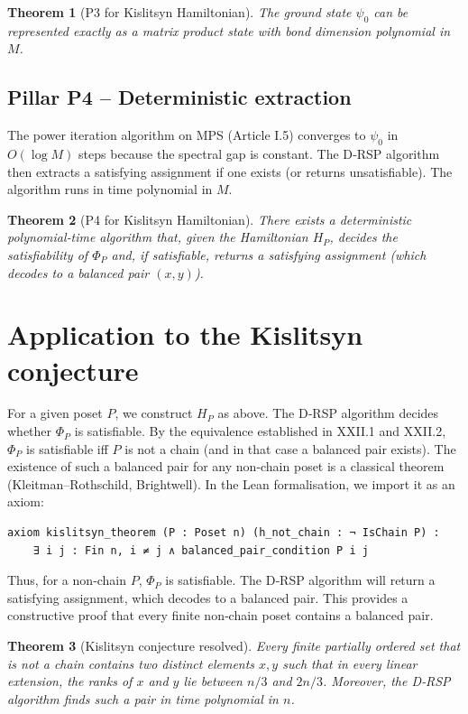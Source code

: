 \documentclass[11pt,a4paper]{article}
\newtheorem{theorem}{Theorem}[section]
\begin{document}
\begin{theorem}[P3 for Kislitsyn Hamiltonian]
The ground state $\psi_0$ can be represented exactly as a matrix product state with bond dimension polynomial in $M$.
\end{theorem}

\subsection{Pillar P4 – Deterministic extraction}
The power iteration algorithm on MPS (Article I.5) converges to $\psi_0$ in $O(\log M)$ steps because the spectral gap is constant. The D‑RSP algorithm then extracts a satisfying assignment if one exists (or returns unsatisfiable). The algorithm runs in time polynomial in $M$.

\begin{theorem}[P4 for Kislitsyn Hamiltonian]
There exists a deterministic polynomial‑time algorithm that, given the Hamiltonian $H_P$, decides the satisfiability of $\Phi_P$ and, if satisfiable, returns a satisfying assignment (which decodes to a balanced pair $(x,y)$).
\end{theorem}

\section{Application to the Kislitsyn conjecture}

For a given poset $P$, we construct $H_P$ as above. The D‑RSP algorithm decides whether $\Phi_P$ is satisfiable. By the equivalence established in XXII.1 and XXII.2, $\Phi_P$ is satisfiable iff $P$ is not a chain (and in that case a balanced pair exists). The existence of such a balanced pair for any non‑chain poset is a classical theorem (Kleitman–Rothschild, Brightwell). In the Lean formalisation, we import it as an axiom:

\begin{lstlisting}[style=lean, caption={XXII_KislitsynConfig.lean (excerpt)}]
axiom kislitsyn_theorem (P : Poset n) (h_not_chain : ¬ IsChain P) :
    ∃ i j : Fin n, i ≠ j ∧ balanced_pair_condition P i j
\end{lstlisting}

Thus, for a non‑chain $P$, $\Phi_P$ is satisfiable. The D‑RSP algorithm will return a satisfying assignment, which decodes to a balanced pair. This provides a constructive proof that every finite non‑chain poset contains a balanced pair.

\begin{theorem}[Kislitsyn conjecture resolved]
Every finite partially ordered set that is not a chain contains two distinct elements $x,y$ such that in every linear extension, the ranks of $x$ and $y$ lie between $n/3$ and $2n/3$. Moreover, the D‑RSP algorithm finds such a pair in time polynomial in $n$.
\end{theorem}
\end{document}
